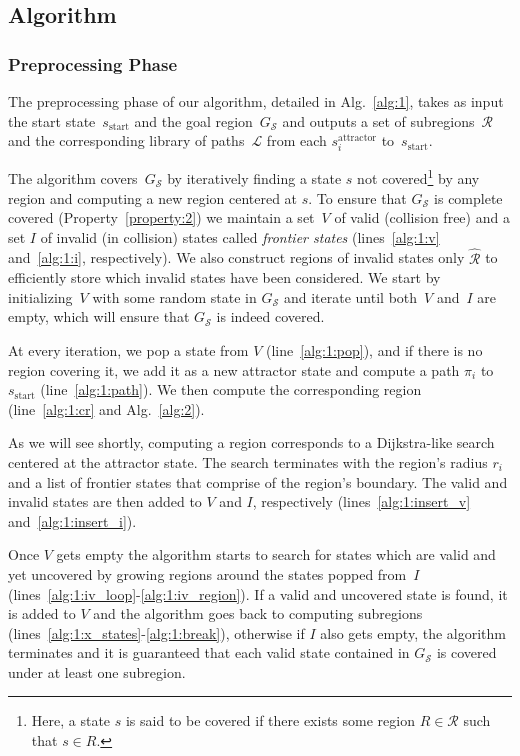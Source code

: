 \documentclass[letterpaper]{article} %
\newcommand{\calL}{\ensuremath{\mathcal{L}}\xspace}
\newcommand{\calS}{\ensuremath{\mathcal{S}}\xspace}
\newcommand{\calR}{\ensuremath{\mathcal{R}}\xspace}
\newcommand{\sAttract}{\ensuremath{s^{\text{attractor}}_i}\xspace}
\newcommand{\sStart}{\ensuremath{s_{\text{start}}\xspace}}
\begin{document}
\subsection {Algorithm}
\label{subsec:alg}
\subsubsection{Preprocessing Phase}
The preprocessing phase of our algorithm, detailed in Alg.~\ref{alg:1}, takes as input the start state~$\sStart$ and the goal region~$G_\calS$ and outputs a set of subregions~$\calR$ and the corresponding library of paths~$\calL$ from each \sAttract to~\sStart. 

The algorithm covers~$G_\calS$ by iteratively finding a state $s$ not covered\footnote{Here, a state $s$ is said to be covered if there exists some region $R \in \calR$ such that $s \in R$.} by any region and computing a new region centered at $s$.
To ensure that $G_\calS$ is complete covered (Property~\ref{property:2}) we maintain a set~$V$ of valid (collision free) and a set $I$ of invalid (in collision) states called \emph{frontier states} (lines~\ref{alg:1:v} and~\ref{alg:1:i}, respectively).
We also construct regions of invalid states only $\hat{\calR}$ to efficiently store which invalid states have been considered.
We start by initializing~$V$ with some random state in $G_\calS$ and iterate until both~$V$ and~$I$ are empty, which will ensure that $G_\calS$ is indeed covered.

At every iteration, we pop a state from $V$ (line~\ref{alg:1:pop}), and if there is no region covering it, we add it as a new attractor state and compute a path $\pi_i$ to $\sStart$ (line~\ref{alg:1:path}).
We then compute the corresponding region (line~\ref{alg:1:cr} and Alg.~\ref{alg:2}).

As we will see shortly, computing a region corresponds to a Dijkstra-like search centered at the attractor state.
The search terminates with the region's radius $r_i$ and a list of frontier states that comprise of the region's boundary.
The valid and invalid states are then added to $V$ and $I$, respectively (lines~\ref{alg:1:insert_v} and~\ref{alg:1:insert_i}).


Once $V$ gets empty the algorithm starts to search for states which are valid and yet uncovered by growing regions around the states popped from~$I$ (lines~\ref{alg:1:iv_loop}-\ref{alg:1:iv_region}). If a valid and uncovered state is found, it is added to $V$ and the algorithm goes back to computing subregions (lines~\ref{alg:1:x_states}-\ref{alg:1:break}), otherwise if $I$ also gets empty, the algorithm terminates and it is guaranteed that each valid state contained in $G_\calS$ is covered under at least one subregion.
\end{document}

